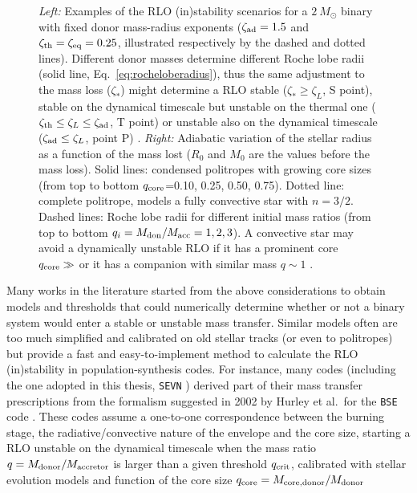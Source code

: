 \documentclass[a4paper,titlepage]{book}     	%
\newcommand{\sun}{\ensuremath{_\odot}}
\newcommand{\msun}{\ensuremath{M\sun}}
\begin{document}
\begin{figure}
\begin{minipage}{.49\textwidth}
	\end{minipage}
	\caption{\emph{Left:} Examples of the RLO (in)stability scenarios for a $\SI{2}{\msun}$ binary with fixed donor mass-radius exponents ($\zeta_\textup{ad}=1.5$ and $\zeta_\textup{th}=\zeta_\textup{eq}=0.25$, illustrated respectively by the dashed and dotted lines). Different donor masses determine different Roche lobe radii (solid line, Eq.\ \ref{eq:rocheloberadius}), thus the same adjustment to the mass loss ($\zeta_*$) might determine a RLO stable ($\zeta_* \geq \zeta_L$, S point), stable on the dynamical timescale but unstable on the thermal one ($\zeta_\textup{th} \leq \zeta_L \leq \zeta_\textup{ad}$, T point) or unstable also on the dynamical timescale ($\zeta_\textup{ad} \leq \zeta_L$, point P) \cite{binaries}. \emph{Right:} Adiabatic variation of the stellar radius as a function of the mass lost ($R_0$ and $M_0$ are the values before the mass loss). Solid lines: condensed politropes with growing core sizes (from top to bottom $q_\textup{core}$=0.10, 0.25, 0.50, 0.75). Dotted line: complete politrope, models a fully convective star with $n=3/2$. Dashed lines: Roche lobe radii for different initial mass ratios (from top to bottom $q_i=M_{\rm don}/M_{\rm acc}=1,2,3$). A convective star may avoid a dynamically unstable RLO if it has a prominent core $q_{\rm core} \gg$ or it has a companion with similar mass $q \sim 1$ \cite{hjellmingwebbink1987_coreRLOF}.}\label{fig:RLOstability}
\end{figure}


Many works in the literature started from the above considerations to obtain models and thresholds that could numerically determine whether or not a binary system would enter a stable or unstable mass transfer. Similar models often are too much simplified and calibrated on old stellar tracks (or even to politropes) but provide a fast and easy-to-implement method to calculate the RLO (in)stability in population-synthesis codes. For instance, many codes (including the one adopted in this thesis, \texttt{SEVN} \cite{spera2019_mergingBBH}) derived part of their mass transfer prescriptions from the formalism suggested in 2002 by Hurley et al.\ for the \texttt{BSE} code \cite{Hurley2002}. These codes assume a one-to-one correspondence between the burning stage, the radiative/convective nature of the envelope and the core size, starting a RLO unstable on the dynamical timescale when the mass ratio $q=M_{\rm donor}/M_{\rm accretor}$ is larger than a given threshold $q_{\rm crit}$, calibrated with stellar evolution models and function of the core size $q_{\rm core}=M_{\rm core, donor}/M_{\rm donor}$
\end{document}
